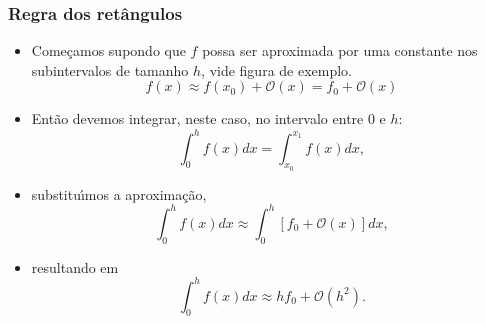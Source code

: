 \documentclass[xcolor=table]{beamer}
\newenvironment{stepitemize}{\begin{itemize}[<+->]}{\end{itemize} }
\begin{document}
\begin{frame}%

\frametitle{Regra dos ret\^{a}ngulos}

\begin{stepitemize}
\item Come\c{c}amos supondo que $f$ possa ser aproximada por uma constante
nos subintervalos de tamanho $h$, vide figura de exemplo.%
\[
f\left( x\right) \approx f\left( x_{0}\right) +\mathcal{O}\left( x\right)
=f_{0}+\mathcal{O}\left( x\right) 
\]

\item Ent\~{a}o devemos integrar, neste caso, no intervalo entre $0$ e $h$:%
\[
\int_{0}^{h}f\left( x\right) dx=\int_{x_{0}}^{x_{1}}f\left( x\right) dx ,
\]

\item substitu\'{\i}mos a aproxima\c{c}\~{a}o,%
\[
\int_{0}^{h}f\left( x\right) dx\approx \int_{0}^{h}\left[ f_{0}+\mathcal{O}\left(
x\right) \right] dx ,
\]

\item resultando em%
\begin{equation}
\int_{0}^{h}f\left( x\right) dx\approx hf_{0}+\mathcal{O}\left( h^{2}\right) .
\label{eq.retangulo}
\end{equation}
\end{stepitemize}

\transboxout%
\end{frame}%
\end{document}
